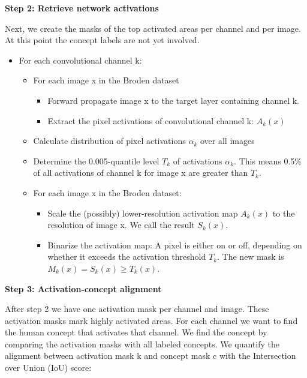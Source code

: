\documentclass[12pt,]{krantz}
\providecommand{\tightlist}{%
  \setlength{\itemsep}{0pt}\setlength{\parskip}{0pt}}
\begin{document}
\textbf{Step 2: Retrieve network activations}

Next, we create the masks of the top activated areas per channel and per
image. At this point the concept labels are not yet involved.

\begin{itemize}
\tightlist
\item
  For each convolutional channel k:

  \begin{itemize}
  \tightlist
  \item
    For each image x in the Broden dataset

    \begin{itemize}
    \tightlist
    \item
      Forward propagate image x to the target layer containing channel
      k.
    \item
      Extract the pixel activations of convolutional channel k:
      \(A_k(x)\)
    \end{itemize}
  \item
    Calculate distribution of pixel activations \(\alpha_k\) over all
    images
  \item
    Determine the 0.005-quantile level \(T_k\) of activations
    \(\alpha_k\). This means 0.5\% of all activations of channel k for
    image x are greater than \(T_k\).
  \item
    For each image x in the Broden dataset:

    \begin{itemize}
    \tightlist
    \item
      Scale the (possibly) lower-resolution activation map \(A_k(x)\) to
      the resolution of image x. We call the result \(S_k(x)\).
    \item
      Binarize the activation map: A pixel is either on or off,
      depending on whether it exceeds the activation threshold \(T_k\).
      The new mask is \(M_k(x)=S_k(x)\geq{}T_k(x)\).
    \end{itemize}
  \end{itemize}
\end{itemize}

\textbf{Step 3: Activation-concept alignment}

After step 2 we have one activation mask per channel and image. These
activation masks mark highly activated areas. For each channel we want
to find the human concept that activates that channel. We find the
concept by comparing the activation masks with all labeled concepts. We
quantify the alignment between activation mask k and concept mask c with
the Intersection over Union (IoU) score:
\end{document}
